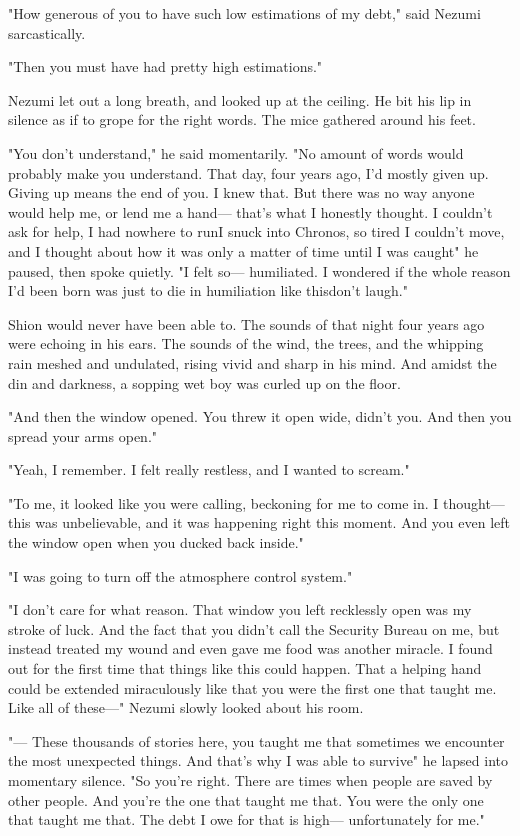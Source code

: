 "How generous of you to have such low estimations of my debt," said
Nezumi sarcastically.

"Then you must have had pretty high estimations."

Nezumi let out a long breath, and looked up at the ceiling. He bit his
lip in silence as if to grope for the right words. The mice gathered
around his feet.

"You don't understand," he said momentarily. "No amount of words would
probably make you understand. That day, four years ago, I'd mostly given
up. Giving up means the end of you. I knew that. But there was no way
anyone would help me, or lend me a hand--- that's what I honestly thought.
I couldn't ask for help, I had nowhere to run\el I snuck into Chronos,
so tired I couldn't move, and I thought about how it was only a matter
of time until I was caught\el " he paused, then spoke quietly. "I felt
so--- humiliated. I wondered if the whole reason I'd been born was just to
die in humiliation like this\el don't laugh."

Shion would never have been able to. The sounds of that night four years
ago were echoing in his ears. The sounds of the wind, the trees, and the
whipping rain meshed and undulated, rising vivid and sharp in his mind.
And amidst the din and darkness, a sopping wet boy was curled up on the
floor.

"And then the window opened. You threw it open wide, didn't you. And
then you spread your arms open."

"Yeah, I remember. I felt really restless, and I wanted to scream."

"To me, it looked like you were calling, beckoning for me to come in. I
thought--- this was unbelievable, and it was happening right this moment.
And you even left the window open when you ducked back inside."

"I was going to turn off the atmosphere control system."

"I don't care for what reason. That window you left recklessly open was
my stroke of luck. And the fact that you didn't call the Security Bureau
on me, but instead treated my wound and even gave me food was another
miracle. I found out for the first time that things like this could
happen. That a helping hand could be extended miraculously like that\el 
you were the first one that taught me. Like all of these---" Nezumi slowly
looked about his room.

"--- These thousands of stories here, you taught me that sometimes we
encounter the most unexpected things. And that's why I was able to
survive\el " he lapsed into momentary silence. "So you're right. There
are times when people are saved by other people. And you're the one that
taught me that. You were the only one that taught me that. The debt I
owe for that is high--- unfortunately for me."

